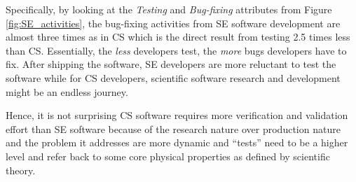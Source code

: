 \documentclass[sigconf,review,anonymous]{acmart}
\newcommand{\ei}{\end{itemize}}
\begin{document}
Specifically, by looking at the \textit{Testing} and \textit{Bug-fixing} attributes from Figure \ref{fig:SE_activities}, the bug-fixing activities from SE software development are almost three times as in CS which is the direct result from testing 2.5 times less than CS. Essentially, the \textit{less} developers test, the \textit{more} bugs developers have to fix. After shipping the software, SE developers are more reluctant to test the software while for CS developers, scientific software research and development might be an endless journey.

Hence, it is not surprising CS software requires more verification and validation effort than SE software because of the research nature over production nature and the problem it addresses are more dynamic and  ``tests'' need to be a higher level and refer back to some core physical properties as defined
by scientific theory.  




 

 

\end{document}
